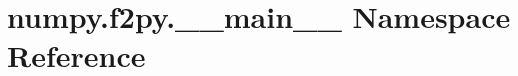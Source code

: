 \hypertarget{namespacenumpy_1_1f2py_1_1____main____}{}\section{numpy.\+f2py.\+\_\+\+\_\+main\+\_\+\+\_\+ Namespace Reference}
\label{namespacenumpy_1_1f2py_1_1____main____}
